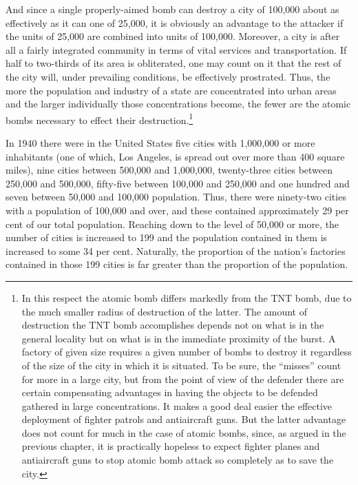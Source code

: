 And since a single properly-aimed bomb can destroy a city of 100,000 about as effectively as it can one of 25,000, it is obviously an advantage to the attacker if the units of 25,000 are combined into units of 100,000. Moreover, a city is after all a fairly integrated community in terms of vital services and transportation. If half to two-thirds of its area is obliterated, one may count on it that the rest of the city will, under prevailing conditions, be effectively prostrated. Thus, the more the population and industry of a state are concentrated into urban areas and the larger individually those concentrations become, the fewer are the atomic bombs necessary to effect their destruction.\footnote{In this respect the atomic bomb differs markedly from the TNT bomb, due to the much smaller radius of destruction of the latter. The amount of destruction the TNT bomb accomplishes depends not on what is in the general locality but on what is in the immediate proximity of the burst. A factory of given size requires a given number of bombs to destroy it regardless of the size of the city in which it is situated. To be sure, the ``misses'' count for more in a large city, but from the point of view of the defender there are certain compensating advantages in having the objects to be defended gathered in large concentrations. It makes a good deal easier the effective deployment of fighter patrols and antiaircraft guns. But the latter advantage does not count for much in the case of atomic bombs, since, as argued in the previous chapter, it is practically hopeless to expect fighter planes and antiaircraft guns to stop atomic bomb attack so completely as to save the city.}

In 1940 there were in the United States five cities with 1,000,000 or more inhabitants (one of which, Los Angeles, is spread out over more than 400 square miles), nine cities between 500,000 and 1,000,000, twenty-three cities between 250,000 and 500,000, fifty-five between 100,000 and 250,000 and one hundred and seven between 50,000 and 100,000 population. Thus, there were ninety-two cities with a population of 100,000 and over, and these contained approximately 29 per cent of our total population. Reaching down to the level of 50,000 or more, the number of cities is increased to 199 and the population contained in them is increased to some 34 per cent. Naturally, the proportion of the nation's factories contained in those 199 cities is far greater than the proportion of the population.

